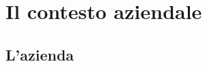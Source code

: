 
\chapter{Il contesto aziendale}
\label{cap:contesto-aziendale}




    
    
    
    
    

\section{L'azienda}
\label{azienda}

